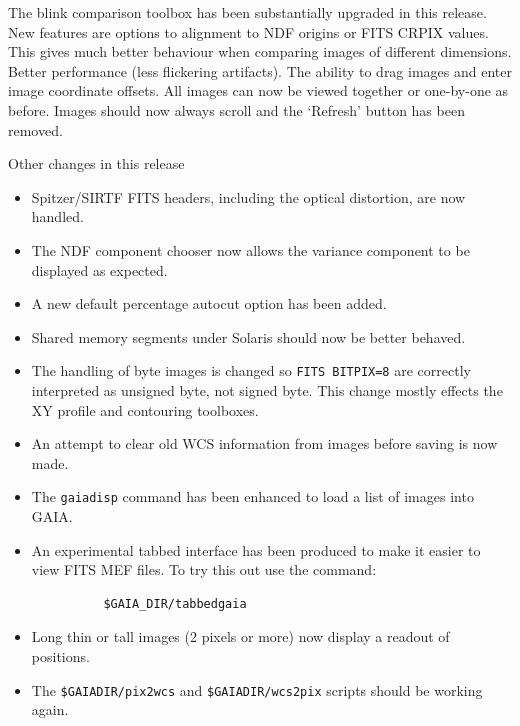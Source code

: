 \documentclass[twoside,11pt]{article}
\renewcommand{\_}{\texttt{\symbol{95}}}
\newcommand{\mytt}[1]{{\texttt{#1}}}
\begin{document}
The blink comparison toolbox has been substantially upgraded in this
release. New features are options to alignment to NDF origins or FITS CRPIX
values. This gives much better behaviour when comparing images of different
dimensions. Better performance (less flickering artifacts). The ability to
drag images and enter image coordinate offsets. All images can now be viewed
together or one-by-one as before. Images should now always scroll and the
`Refresh' button has been removed.

Other changes in this release
\begin{itemize}
     \item Spitzer/SIRTF FITS headers, including the optical distortion,
       are now handled.

     \item The NDF component chooser now allows the variance component to be
       displayed as expected.

     \item A new default percentage autocut option has been added.

     \item Shared memory segments under Solaris should now be better behaved.

     \item The handling of byte images is changed so \mytt{FITS BITPIX=8}
       are correctly
       interpreted as unsigned byte, not signed byte. This change mostly
       effects the XY profile and contouring toolboxes.

     \item An attempt to clear old WCS information from images before saving
       is now made.

     \item The \mytt{gaiadisp} command has been enhanced to load a list of
       images into GAIA.

     \item An experimental tabbed interface has been produced to make it
       easier to view FITS MEF files. To try this out use the command:
      \begin{verbatim}
          $GAIA_DIR/tabbedgaia
      \end{verbatim}

     \item Long thin or tall images (2 pixels or more) now display a readout of
       positions.

     \item The \mytt{\$GAIA\_DIR/pix2wcs} and
        \mytt{\$GAIA\_DIR/wcs2pix} scripts should be
       working again.


\end{itemize}
\end{document}
